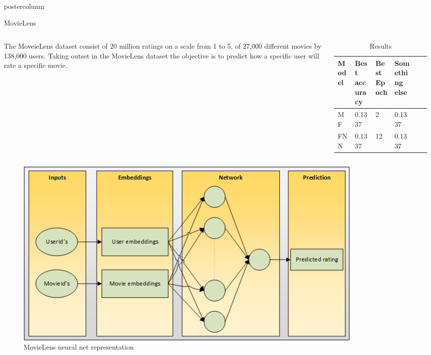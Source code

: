 \documentclass[final,hyperref={pdfpagelabels=false}]{beamer}
\begin{document}
\begin{frame}
\begin{columns}
\begin{column}{.49\paperwidth}
\begin{beamercolorbox}[center,wd=\textwidth]{postercolumn}
\begin{minipage}[T]{.99\textwidth}
{ \begin{block}{MovieLens}
 \begin{columns}
 \begin{column}{1\textwidth}



\centering
\begin{minipage}[t]{0.96\textwidth}
			

\hspace{0.5cm} 
\vspace{-1cm}
\begin{columns}
 \begin{column}{0.45\textwidth}
 \justifying
 \small{
	The MoveieLens dataset consist of 20 million ratings on a scale from 1 to 5, of 27,000 different movies by 138,000 users. Taking outset in the MovieLens dataset the objective is to predict how a specific user will rate a specific movie. }
 \end{column}
 \begin{column}{0.49\textwidth}

\begin{table}[h]
\small
\centering
\caption{Results} 
\label{res:MovieLens_results}
\begin{tabular}{llllll}
\toprule
Model  & Best accuracy        & Best Epoch     & Something else    \\
\midrule
MF  	&  0.1337        & 2       & 0.1337    \\
FNN	  &  0.1337        & 12      & 0.1337    \\
\bottomrule
\end{tabular}
\end{table}

 \end{column}
 \end{columns}
 
 \begin{figure}

\includegraphics[width=0.85\textwidth]{movielensnet.png}
 \caption{MovieLens neural net representation}
\end{figure}  


\end{minipage}
\end{column}
\end{columns}
\end{block}}
\end{minipage}
\end{beamercolorbox}
\end{column}
\end{columns}
\end{frame}
\end{document}
